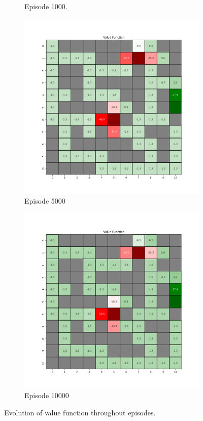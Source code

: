 \documentclass{assignment}
\begin{document}
\begin{figure}[H]
\begin{subfigure}{0.3\textwidth}
    \caption{Episode 1000.}
    \end{subfigure}\hfill
    \begin{subfigure}{0.3\textwidth}
        \includegraphics[width=\textwidth]{figures/value_td/gamma_sweep/value_function_alpha_0.1_gamma_0.25_epsilon_0.2_iteration_5000.png}
    \caption{Episode 5000}
    \end{subfigure}\hfill
    \begin{subfigure}{0.3\textwidth}
        \includegraphics[width=\textwidth]{figures/value_td/gamma_sweep/value_function_alpha_0.1_gamma_0.25_epsilon_0.2_iteration_10000.png}
    \caption{Episode 10000}
    \end{subfigure}
    \caption{Evolution of value function throughout episodes.}
    \label{fig:gamma_0.25_td_learning_value}
\end{figure}
\end{document}
